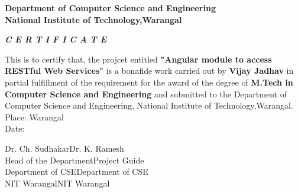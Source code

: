 \newpage
\begin{center}

\vspace*{0.2in}
\vspace{0.2in}
\textbf{Department of Computer Science and Engineering}\\

\textbf{National Institute of Technology,Warangal}

\end{center}
\vspace{0.3in}
\begin{center}

\textbf{\it{\large C E R T I F I C A T E}}
\vspace{0.2in}
\end{center}
		\noindent
  				\setlength{\baselineskip}{1.1\baselineskip}
 \hspace{0.2in} This is to certify that, the projcet entitled \textbf{"Angular module to access RESTful Web Services"} is a bonafide work carried out by \textbf{Vijay Jadhav} in partial fulfillment of the requirement for the award of the degree of \textbf{M.Tech in Computer Science and Engineering} and submitted to the Department of Computer Science and Engineering, National Institute of Technology,Warangal.  \\

		\noindent 
		\vspace{0.2 in}
\noindent Place: Warangal \\
Date:\\
\vspace*{0.6in}

\vspace{1.5cm}
\noindent Dr. Ch. Sudhakar\hspace{7.9cm}Dr. K. Ramesh\\
Head of the Department\hspace{6.80cm}Project Guide\\
Department of CSE\hspace{7.54cm}Department of CSE\\
NIT Warangal\hspace{8.46cm}NIT Warangal\\



